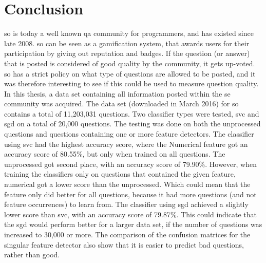 \label{chap:chapter5}

\section{Conclusion}
\label{sec:conclusion}
\gls{so} is today a well known \gls{qa} community for programmers, and has existed since late 2008.
\gls{so} can be seen as a gamification system, that awards users for their participation by giving out reputation and badges. 
If the question (or answer) that is posted is considered of good quality by the community, it gets up-voted. 
\gls{so} has a strict policy on what type of questions are allowed to be posted, and it was therefore interesting to see if this could be used to measure question quality. 
\vspace{0.5em}\newline
In this thesis, a data set containing all information posted within the \gls{se} community was acquired.
The data set (downloaded in March 2016) for \gls{so} contains a total of 11,203,031 questions.
Two classifier types were tested, \gls{svc} and \gls{sgd} on a total of 20,000 questions.
The testing was done on both the unprocessed questions and questions containing one or more feature detectors.
The classifier using \gls{svc} had the highest accuracy score, where the Numerical feature got an accuracy score of 80.55\%, but only when trained on all questions. 
The unprocessed got second place, with an accuracy score of 79.90\%.
However, when training the classifiers only on questions that contained the given feature, numerical got a lower score than the unprocessed.
Which could mean that the feature only did better  for all questions, because it had more questions (and not feature occurrences) to learn from. 
\vspace{0.5em}\newline
The classifier using \gls{sgd} achieved a slightly lower score than \gls{svc}, with an accuracy score of 79.87\%.
This could indicate that the \gls{sgd} would perform better for a larger data set, if the number of questions was increased to 30,000 or more.
The comparison of the confusion matrices for the singular feature detector also show that it is easier to predict bad questions, rather than good.


